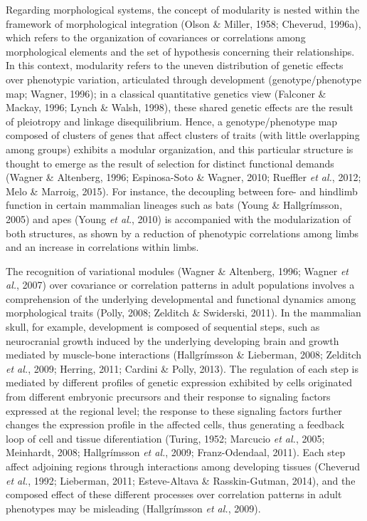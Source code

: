 \documentclass[11pt,twoside]{report}
\begin{document}
Regarding morphological systems, the concept of modularity is nested
within the framework of morphological integration (Olson \& Miller,
1958; Cheverud, 1996a), which refers to the organization of covariances
or correlations among morphological elements and the set of hypothesis
concerning their relationships. In this context, modularity refers to
the uneven distribution of genetic effects over phenotypic variation,
articulated through development (genotype/phenotype map; Wagner, 1996);
in a classical quantitative genetics view (Falconer \& Mackay, 1996;
Lynch \& Walsh, 1998), these shared genetic effects are the result of
pleiotropy and linkage disequilibrium. Hence, a genotype/phenotype map
composed of clusters of genes that affect clusters of traits (with
little overlapping among groups) exhibits a modular organization, and
this particular structure is thought to emerge as the result of
selection for distinct functional demands (Wagner \& Altenberg, 1996;
Espinosa-Soto \& Wagner, 2010; Rueffler \emph{et al.}, 2012; Melo \&
Marroig, 2015). For instance, the decoupling between fore- and hindlimb
function in certain mammalian lineages such as bats (Young \&
Hallgrímsson, 2005) and apes (Young \emph{et al.}, 2010) is accompanied
with the modularization of both structures, as shown by a reduction of
phenotypic correlations among limbs and an increase in correlations
within limbs.

The recognition of variational modules (Wagner \& Altenberg, 1996;
Wagner \emph{et al.}, 2007) over covariance or correlation patterns in
adult populations involves a comprehension of the underlying
developmental and functional dynamics among morphological traits (Polly,
2008; Zelditch \& Swiderski, 2011). In the mammalian skull, for example,
development is composed of sequential steps, such as neurocranial growth
induced by the underlying developing brain and growth mediated by
muscle-bone interactions (Hallgrímsson \& Lieberman, 2008; Zelditch
\emph{et al.}, 2009; Herring, 2011; Cardini \& Polly, 2013). The
regulation of each step is mediated by different profiles of genetic
expression exhibited by cells originated from different embryonic
precursors and their response to signaling factors expressed at the
regional level; the response to these signaling factors further changes
the expression profile in the affected cells, thus generating a feedback
loop of cell and tissue diferentiation (Turing, 1952; Marcucio \emph{et
al.}, 2005; Meinhardt, 2008; Hallgrímsson \emph{et al.}, 2009;
Franz-Odendaal, 2011). Each step affect adjoining regions through
interactions among developing tissues (Cheverud \emph{et al.}, 1992;
Lieberman, 2011; Esteve-Altava \& Rasskin-Gutman, 2014), and the
composed effect of these different processes over correlation patterns
in adult phenotypes may be misleading (Hallgrímsson \emph{et al.},
2009).
\end{document}
